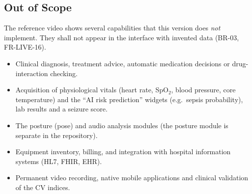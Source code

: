 \documentclass[a4paper,11pt]{scrreprt}
\begin{document}
\subsection{Out of Scope}\label{sec:outofscope}
The reference video shows several capabilities that this version does \emph{not} implement. They shall not appear in the interface with invented data (BR-03, FR-LIVE-16).
\begin{itemize}
  \item Clinical diagnosis, treatment advice, automatic medication decisions or drug-interaction checking.
  \item Acquisition of physiological vitals (heart rate, SpO$_2$, blood pressure, core temperature) and the ``AI risk prediction'' widgets (e.g.\ sepsis probability), lab results and a seizure score.
  \item The posture (pose) and audio analysis modules (the posture module is separate in the repository).
  \item Equipment inventory, billing, and integration with hospital information systems (HL7, FHIR, EHR).
  \item Permanent video recording, native mobile applications and clinical validation of the CV indices.
\end{itemize}
\end{document}
